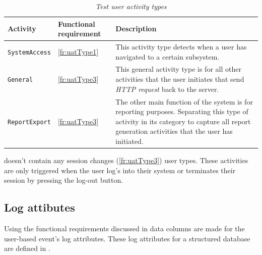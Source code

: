 \begin{table}[!htb]
	\centering
	\caption[Test user activity types]{\textit{Test user activity types}}
	\label{tbl:ch3_testActivityTypes}
	\begin{tabularx}{\textwidth}{|X|l|X|}
		\hline \textbf{Activity} & \textbf{Functional requirement} & \textbf{Description} \\
		\hline \texttt{SystemAccess} & \ref{fr:uatType1} & \RaggedRight This activity type detects when a user has navigated to a certain subsystem. \\ 
		\hline \texttt{General} & \ref{fr:uatType3} & \RaggedRight This general activity type is for all other activities that the user initiates that send \textit{HTTP request} back to the server. \\
		\hline \texttt{ReportExport} & \ref{fr:uatType3} & \RaggedRight The other main function of the system is for reporting purposes. Separating this type of activity in its category to capture all report generation activities that the user has initiated. \\ 
		\hline
	\end{tabularx}
\end{table}

 doesn't contain any session changes (\ref{fr:uatType3}) user types. These activities are only triggered when the user log's into their system or terminates their session by pressing the log-out button.

\subsection{Log attibutes}\label{sec:ch3_implementationLogAtrributes}
Using the functional requirements discussed in  data columns are made for the user-based event's log attributes. These log attributes for a structured database are defined in . 

